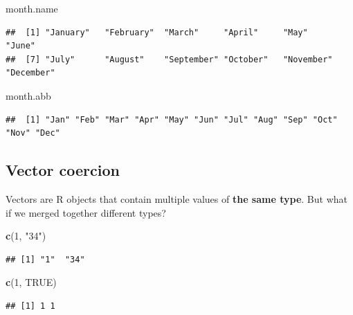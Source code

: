 \documentclass[
]{book}
\newenvironment{Shaded}{\begin{snugshade}}{\end{snugshade}}
\newcommand{\DecValTok}[1]{\textcolor[rgb]{0.00,0.00,0.81}{#1}}
\newcommand{\KeywordTok}[1]{\textcolor[rgb]{0.13,0.29,0.53}{\textbf{#1}}}
\newcommand{\NormalTok}[1]{#1}
\newcommand{\OtherTok}[1]{\textcolor[rgb]{0.56,0.35,0.01}{#1}}
\newcommand{\StringTok}[1]{\textcolor[rgb]{0.31,0.60,0.02}{#1}}
\begin{document}
\begin{Shaded}
\begin{Highlighting}[]
\NormalTok{month.name}
\end{Highlighting}
\end{Shaded}

\begin{verbatim}
##  [1] "January"   "February"  "March"     "April"     "May"       "June"     
##  [7] "July"      "August"    "September" "October"   "November"  "December"
\end{verbatim}

\begin{Shaded}
\begin{Highlighting}[]
\NormalTok{month.abb}
\end{Highlighting}
\end{Shaded}

\begin{verbatim}
##  [1] "Jan" "Feb" "Mar" "Apr" "May" "Jun" "Jul" "Aug" "Sep" "Oct" "Nov" "Dec"
\end{verbatim}

\hypertarget{vector-coercion}{%
\subsection{Vector coercion}\label{vector-coercion}}

Vectors are R objects that contain multiple values of \textbf{the same type}. But what if we merged together different types?

\begin{Shaded}
\begin{Highlighting}[]
\KeywordTok{c}\NormalTok{(}\DecValTok{1}\NormalTok{, }\StringTok{"34"}\NormalTok{)}
\end{Highlighting}
\end{Shaded}

\begin{verbatim}
## [1] "1"  "34"
\end{verbatim}

\begin{Shaded}
\begin{Highlighting}[]
\KeywordTok{c}\NormalTok{(}\DecValTok{1}\NormalTok{, }\OtherTok{TRUE}\NormalTok{)}
\end{Highlighting}
\end{Shaded}

\begin{verbatim}
## [1] 1 1
\end{verbatim}
\end{document}
